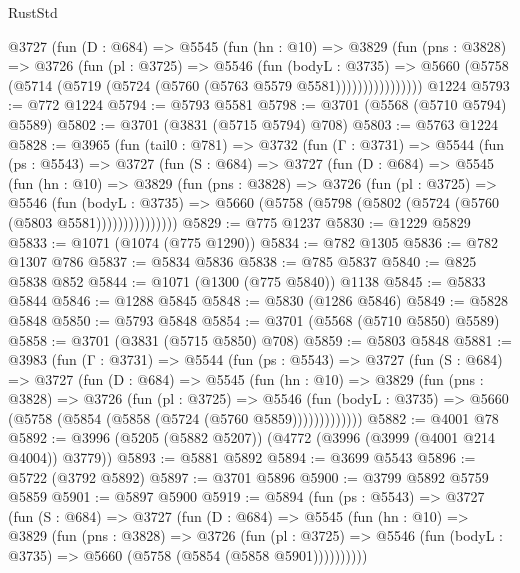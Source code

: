 \begin{lexlean}{RustStd}
\begin{coremodule}
{\begin{coremodule}
{{{{{{{{{{{{{{            @3727
              (fun (D : @684) =>
              @5545
                (fun (hn : @10) =>
                @3829
                  (fun (pns : @3828) =>
                  @3726
                    (fun (pl : @3725) =>
                    @5546
                      (fun (bodyL : @3735) =>
                      @5660 (@5758 (@5714 (@5719 (@5724 (@5760 (@5763 @5579 @5581))))))))))))))))
    @1224
@5793 := @772 @1224
@5794 := @5793 @5581
@5798 := @3701 (@5568 (@5710 @5794) @5589)
@5802 := @3701 (@3831 (@5715 @5794) @708)
@5803 := @5763 @1224
@5828 := @3965
    (fun (tail0 : @781) =>
    @3732
      (fun (Γ : @3731) =>
      @5544
        (fun (ps : @5543) =>
        @3727
          (fun (S : @684) =>
          @3727
            (fun (D : @684) =>
            @5545
              (fun (hn : @10) =>
              @3829
                (fun (pns : @3828) =>
                @3726
                  (fun (pl : @3725) =>
                  @5546
                    (fun (bodyL : @3735) =>
                    @5660 (@5758 (@5798 (@5802 (@5724 (@5760 (@5803 @5581)))))))))))))))
@5829 := @775 @1237
@5830 := @1229 @5829
@5833 := @1071 (@1074 (@775 @1290))
@5834 := @782 @1305
@5836 := @782 @1307 @786
@5837 := @5834 @5836
@5838 := @785 @5837
@5840 := @825 @5838 @852
@5844 := @1071 (@1300 (@775 @5840)) @1138
@5845 := @5833 @5844
@5846 := @1288 @5845
@5848 := @5830 (@1286 @5846)
@5849 := @5828 @5848
@5850 := @5793 @5848
@5854 := @3701 (@5568 (@5710 @5850) @5589)
@5858 := @3701 (@3831 (@5715 @5850) @708)
@5859 := @5803 @5848
@5881 := @3983
    (fun (Γ : @3731) =>
    @5544
      (fun (ps : @5543) =>
      @3727
        (fun (S : @684) =>
        @3727
          (fun (D : @684) =>
          @5545
            (fun (hn : @10) =>
            @3829
              (fun (pns : @3828) =>
              @3726
                (fun (pl : @3725) =>
                @5546
                  (fun (bodyL : @3735) =>
                  @5660 (@5758 (@5854 (@5858 (@5724 (@5760 @5859)))))))))))))
@5882 := @4001 @78
@5892 := @3996 (@5205 (@5882 @5207)) (@4772 (@3996 (@3999 (@4001 @214 @4004)) @3779))
@5893 := @5881 @5892
@5894 := @3699 @5543
@5896 := @5722 (@3792 @5892)
@5897 := @3701 @5896
@5900 := @3799 @5892 @5759 @5859
@5901 := @5897 @5900
@5919 := @5894
    (fun (ps : @5543) =>
    @3727
      (fun (S : @684) =>
      @3727
        (fun (D : @684) =>
        @5545
          (fun (hn : @10) =>
          @3829
            (fun (pns : @3828) =>
            @3726
              (fun (pl : @3725) =>
              @5546 (fun (bodyL : @3735) => @5660 (@5758 (@5854 (@5858 @5901))))))))))
}}}}}}}}}}}}}}
\end{coremodule}}
\end{coremodule}
\end{lexlean}
